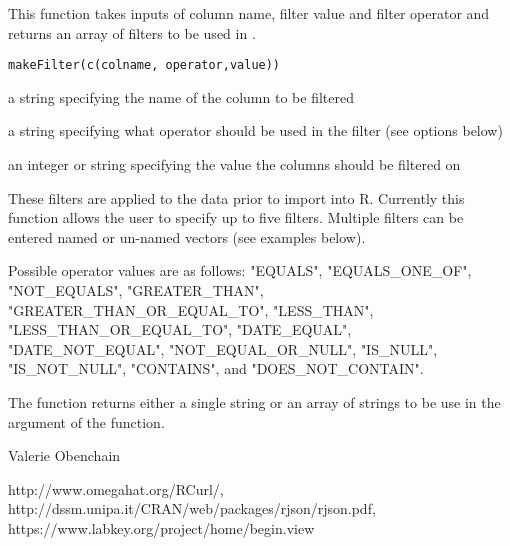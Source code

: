 \begin{Description}\relax
This function takes inputs of column name, filter value and filter operator and 
returns an array of filters to be used in .
\end{Description}
\begin{Usage}
\begin{verbatim}
makeFilter(c(colname, operator,value))
\end{verbatim}
\end{Usage}
\begin{Arguments}
\begin{ldescription}
\item[\code{colname}] a string specifying the name of the column to be filtered
\item[\code{operator}] a string specifying what operator should be used in the filter (see options below)
\item[\code{value}] an integer or string specifying the value the columns should be filtered on
\end{ldescription}
\end{Arguments}
\begin{Details}\relax
These filters are applied to the data prior to import into R. Currently this function
allows the user to specify up to five filters. Multiple filters can be entered named or
un-named vectors (see examples below).

Possible operator values are as follows:
"EQUALS", "EQUALS\_ONE\_OF", "NOT\_EQUALS", "GREATER\_THAN", "GREATER\_THAN\_OR\_EQUAL\_TO", "LESS\_THAN",
"LESS\_THAN\_OR\_EQUAL\_TO", "DATE\_EQUAL", "DATE\_NOT\_EQUAL", "NOT\_EQUAL\_OR\_NULL",
"IS\_NULL", "IS\_NOT\_NULL", "CONTAINS", and "DOES\_NOT\_CONTAIN".
\end{Details}
\begin{Value}
The function returns either a single string or an array of strings to be use in the
 argument of the  function.
\end{Value}
\begin{Author}\relax
Valerie Obenchain
\end{Author}
\begin{References}\relax
http://www.omegahat.org/RCurl/, \\
http://dssm.unipa.it/CRAN/web/packages/rjson/rjson.pdf,\\
https://www.labkey.org/project/home/begin.view
\end{References}
